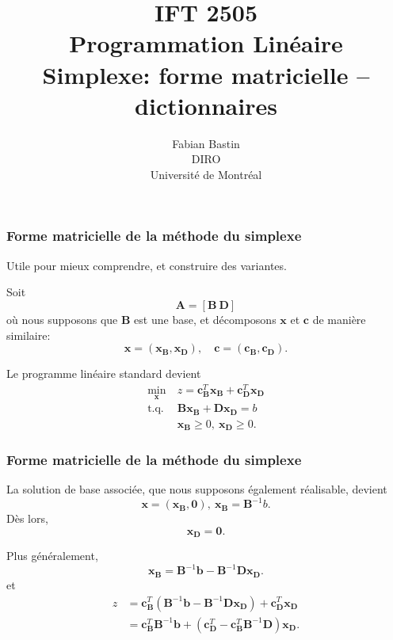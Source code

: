 \documentclass[usepdftitle=false]{beamer}
\title[IFT2505]{IFT 2505\\Programmation Linéaire\\Simplexe: forme matricielle -- dictionnaires}
\author[Fabian Bastin]{Fabian Bastin\\DIRO\\Université de Montréal}
\date{}
\def\bb{\boldsymbol{b}}
\def\bc{\boldsymbol{c}}
\def\bx{\boldsymbol{x}}
\def\bA{\boldsymbol{A}}
\def\bB{\boldsymbol{B}}
\def\bD{\boldsymbol{D}}
\def\bzero{\boldsymbol{0}}
\begin{document}
\frame{\titlepage}


\begin{frame}
\frametitle{Forme matricielle de la méthode du simplexe}

Utile pour mieux comprendre, et construire des variantes.

\mbox{}

Soit
\[
\bA = [ \bB\ \bD ]
\]
où nous supposons que $\bB$ est une base, et décomposons $\bx$ et $\bc$ de manière similaire:
\[
\bx = (\bx_{\bB}, \bx_{\bD}), \quad \bc = (\bc_{\bB}, \bc_{\bD}).
\]

\mbox{}

Le programme linéaire standard devient
\begin{align*}
\min_{\bx} \ & 
z = \bc_{\bB}^T\bx_{\bB} + \bc_{\bD}^T \bx_{\bD} \\
\mbox{t.q. } & \bB\bx_{\bB} + \bD\bx_{\bD} = b \\
& \bx_{\bB} \geq 0,\ \bx_{\bD} \geq 0.
\end{align*}

\end{frame}

\begin{frame}
\frametitle{Forme matricielle de la méthode du simplexe}

La solution de base associée, que nous supposons également réalisable, devient
\[
 \bx = (\bx_{\bB}, \bzero), \ \bx_{\bB} = \bB^{-1} b.
\]
Dès lors,
\[
 \bx_{\bD} = \bzero.
\]

\mbox{}

Plus généralement,
\[
  \bx_{\bB} = \bB^{-1} \bb - \bB^{-1}\bD\bx_{\bD}.
\]
et
\begin{align*}
z &= \bc_{\bB}^T\left(\bB^{-1} \bb - \bB^{-1}\bD\bx_{\bD}\right)
 + \bc_{\bD}^T \bx_{\bD} \\
 & = \bc_{\bB}^T \bB^{-1} \bb + \left( \bc_{\bD}^T - \bc_{\bB}^T \bB^{-1} \bD \right) \bx_{\bD}. 
 \end{align*}

\end{frame}
\end{document}
